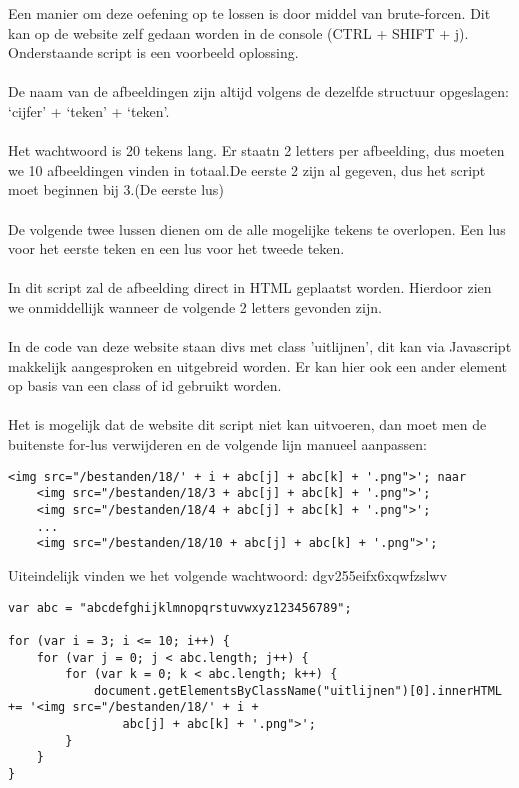 Een manier om deze oefening op te lossen is door middel van brute-forcen. Dit kan op de website zelf gedaan worden in de console (CTRL + SHIFT + j). Onderstaande script is een voorbeeld oplossing.
\\\\
De naam van de afbeeldingen zijn altijd volgens de dezelfde structuur opgeslagen: `cijfer' + `teken' + `teken'.
\\\\
Het wachtwoord is 20 tekens lang. Er staatn 2 letters per afbeelding, dus moeten we 10 afbeeldingen vinden in totaal.De eerste 2 zijn al gegeven, dus het script moet beginnen bij 3.(De eerste lus)
\\\\
De volgende twee lussen dienen om de alle mogelijke tekens te overlopen. Een lus voor het eerste teken en een lus voor het tweede teken.
\\\\
In dit script zal de afbeelding direct in HTML geplaatst worden. Hierdoor zien we onmiddellijk wanneer de volgende 2 letters gevonden zijn.
\\\\
In de code van deze website staan divs met class 'uitlijnen', dit kan via Javascript makkelijk aangesproken en uitgebreid worden. Er kan hier ook een ander element op basis van een class of id gebruikt worden.
\\\\
Het is mogelijk dat de website dit script niet kan uitvoeren, dan moet men de buitenste for-lus verwijderen en de volgende lijn manueel aanpassen:
\begin{lstlisting}
<img src="/bestanden/18/' + i + abc[j] + abc[k] + '.png">'; naar
	<img src="/bestanden/18/3 + abc[j] + abc[k] + '.png">';
	<img src="/bestanden/18/4 + abc[j] + abc[k] + '.png">';
	...
	<img src="/bestanden/18/10 + abc[j] + abc[k] + '.png">';
\end{lstlisting}

Uiteindelijk vinden we het volgende wachtwoord: dgv255eifx6xqwfzslwv

\begin{lstlisting}
var abc = "abcdefghijklmnopqrstuvwxyz123456789";

for (var i = 3; i <= 10; i++) {
	for (var j = 0; j < abc.length; j++) {
		for (var k = 0; k < abc.length; k++) {
			document.getElementsByClassName("uitlijnen")[0].innerHTML += '<img src="/bestanden/18/' + i + 
				abc[j] + abc[k] + '.png">';
		}
	}
}
\end{lstlisting}